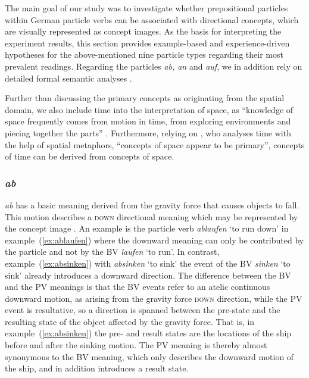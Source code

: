 \documentclass[output=paper]{langsci/langscibook}
\begin{document}
The main goal of our study was to investigate whether prepositional
particles within German particle verbs can be associated with
directional concepts, which are visually represented as concept
images. As the basis for interpreting the experiment results, this
section provides example-based and experience-driven hypotheses for
the above-mentioned nine particle types regarding their most prevalent
readings. Regarding the particles \textit{ab, an} and \textit{auf}, we
in addition rely on detailed formal semantic analyses
\citep{Lechler/Rossdeutscher:09, Kliche:11,Springorum:11}.

Further than discussing the primary concepts as originating from the
spatial domain, we also include time into the interpretation of space,
as ``knowledge of space frequently comes from motion in time, from
exploring environments and piecing together the parts''
\citep{Tversky:11}. Furthermore, relying on \cite{Boroditsky:01}, who
analyses time with the help of spatial metaphors, ``concepts of space
appear to be primary'', concepts of time can be derived from concepts
of space.


\subsubsection{\textit{ab}}

\textit{ab} has a basic meaning derived from the gravity force that
causes objects to fall. This motion describes a \textsc{down}
directional meaning which may be represented by the concept image
. An example is the particle verb \textit{ablaufen}
`to run down' in example~(\ref{ex:ablaufen}) where the downward
meaning can only be contributed by the particle and not by the BV
\textit{laufen} `to run'. In contrast, example~(\ref{ex:absinken})
with \textit{absinken} `to sink'
the event of the BV \textit{sinken} `to sink'
already introduces a downward direction. The difference between the BV
and the PV meanings is that the BV events refer to an atelic
continuous downward motion, as arising from the gravity force
\textsc{down} direction, while the PV event is resultative, so a
direction is spanned between the pre-state and the resulting state of
the object affected by the gravity force. That is, in
example~(\ref{ex:absinken}) the pre- and result states are the
locations of the ship before and after the sinking motion. The PV
meaning is thereby almost synonymous to the BV meaning, which only
describes the downward motion of the ship, and in addition introduces
a result state.
\end{document}
